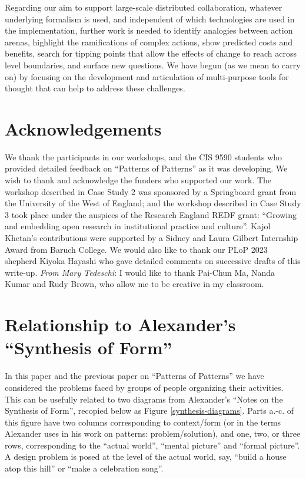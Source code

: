 \documentclass[acmlarge,timestamp]{acmart}
\begin{document}
Regarding our aim to support large-scale distributed collaboration,
whatever underlying formalism is used, and independent of which
technologies are used in the implementation, further work is needed to
identify analogies between action arenas, highlight the ramifications
of complex actions, show predicted costs and benefits, search for
tipping points that allow the effects of change to reach across level
boundaries, and surface new questions.  We have begun (as we mean to
carry on) by focusing on the development and articulation of
multi-purpose tools for thought that can help to address these
challenges.

\section*{Acknowledgements}
We thank the participants in our workshops, and the CIS 9590 students
who provided detailed feedback on “Patterns of Patterns” as it was
developing.  We wish to thank and acknowledge the funders who
supported our work.  The workshop described in Case Study 2 was
sponsored by a Springboard grant from the University of the West of
England; and the workshop described in Case Study 3 took place under
the auspices of the Research England REDF grant: “Growing and
embedding open research in institutional practice and culture”.  Kajol
Khetan’s contributions were supported by a Sidney and Laura Gilbert
Internship Award from Baruch College.  We would also like to thank our
PLoP 2023 shepherd Kiyoka Hayashi who gave detailed comments on
successive drafts of this write-up.  \textit{From Mary Tedeschi}: I
would like to thank Pai-Chun Ma, Nanda Kumar and Rudy Brown, who allow
me to be creative in my classroom.

\appendix
\renewcommand\thefigure{\thesection.\arabic{figure}}

\setcounter{figure}{0}
\section{Relationship to Alexander’s “Synthesis of Form”\label{synthesis-of-form}}
In this paper and the previous paper on “Patterns of Patterns” we have
considered the problems faced by groups of people organizing their
activities.  This can be usefully related to two diagrams from
Alexander's ``Notes on the Synthesis of Form'', recopied below as
Figure \ref{synthesis-diagrams}.  Parts a.-c. of this figure have two
columns corresponding to context/form (or in the terms Alexander uses
in his work on patterns: problem/solution), and one, two, or three
rows, corresponding to the ``actual world'', ``mental picture'' and
``formal picture''.  A design problem is posed at the level of the
actual world, say, ``build a house atop this hill'' or ``make a
celebration song''.
\end{document}
